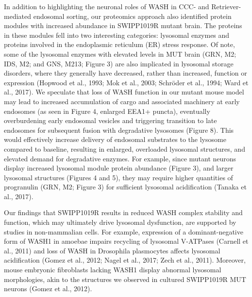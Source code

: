 In addition to highlighting the neuronal roles of WASH in CCC- and
Retriever-mediated endosomal sorting, our proteomics approach also identified
protein modules with increased abundance in SWIPP1019R mutant brain. The
proteins in these modules fell into two interesting categories: lysosomal
enzymes and proteins involved in the endoplasmic reticulum (ER) stress response.
Of note, some of the lysosomal enzymes with elevated levels in MUT brain (GRN,
M2; IDS, M2; and GNS, M213; Figure 3) are also implicated in lysosomal storage
disorders, where they generally have decreased, rather than increased, function
or expression (Hopwood et al., 1993; Mok et al., 2003; Schröder et al., 1994;
Ward et al., 2017). We speculate that loss of WASH function in our mutant mouse
model may lead to increased accumulation of cargo and associated machinery at
early endosomes (as seen in Figure 4, enlarged EEA1+ puncta), eventually
overburdening early endosomal vesicles and triggering transition to late
endosomes for subsequent fusion with degradative lysosomes (Figure 8). This
would effectively increase delivery of endosomal substrates to the lysosome
compared to baseline, resulting in enlarged, overloaded lysosomal structures,
and elevated demand for degradative enzymes. For example, since mutant neurons
display increased lysosomal module protein abundance (Figure 3), and larger
lysosomal structures (Figures 4 and 5), they may require higher quantities of
progranulin (GRN, M2; Figure 3) for sufficient lysosomal acidification (Tanaka
et al., 2017).

Our findings that SWIPP1019R results in reduced WASH complex stability and
function, which may ultimately drive lysosomal dysfunction, are supported by
studies in non-mammalian cells. For example, expression of a dominant-negative
form of WASH1 in amoebae impairs recycling of lysosomal V-ATPases (Carnell et
al., 2011) and loss of WASH in Drosophila plasmocytes affects lysosomal
acidification (Gomez et al., 2012; Nagel et al., 2017; Zech et al., 2011).
Moreover, mouse embryonic fibroblasts lacking WASH1 display abnormal lysosomal
morphologies, akin to the structures we observed in cultured SWIPP1019R MUT
neurons (Gomez et al., 2012). 

